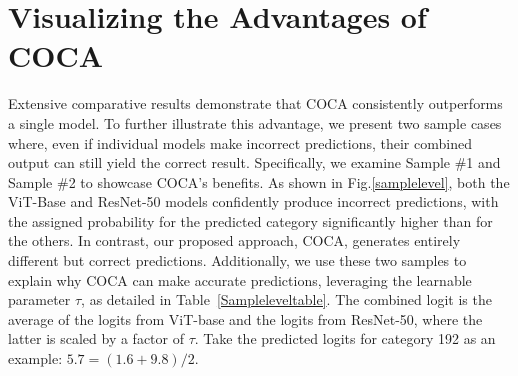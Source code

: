 \section{Visualizing the Advantages of COCA}
\label{VisualizeCOCA}
Extensive comparative results demonstrate that COCA consistently outperforms a single model. To further illustrate this advantage, we present two sample cases where, even if individual models make incorrect predictions, their combined output can still yield the correct result. Specifically, we examine Sample \#1 and Sample \#2 to showcase COCA's benefits. As shown in Fig.\ref{samplelevel}, both the ViT-Base and ResNet-50 models confidently produce incorrect predictions, with the assigned probability for the predicted category significantly higher than for the others. In contrast, our proposed approach, COCA, generates entirely different but correct predictions. Additionally, we use these two samples to explain why COCA can make accurate predictions, leveraging the learnable parameter $\tau$, as detailed in Table~\ref{Sampleleveltable}. The combined logit is the average of the logits from ViT-base and the logits from ResNet-50, where the latter is scaled by a factor of $\tau$. Take the predicted logits for category 192 as an example: $5.7 = (1.6 + 9.8) / 2$.

